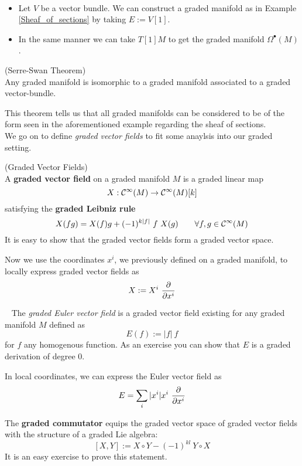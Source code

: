 \begin{example}~
\begin{itemize}
  \item Let $V$ be a vector bundle. We can construct a graded manifold as in Example \ref{Sheaf_of_sections} by taking $E:= V[1]$.

  \item In the same manner we can take $T[1]M$ to get the graded manifold $\Omega^\bullet(M)$.
\end{itemize}
\end{example}

\begin{theo} (Serre-Swan Theorem)\\
  Any graded manifold is isomorphic to a graded manifold associated to a graded vector-bundle.
\end{theo}

This theorem tells us that all graded manifolds can be considered to be of the form seen in the aforementioned example regarding the sheaf of sections.\\

We go on to define \emph{graded vector fields} to fit some anaylsis into our graded setting.

\begin{definition} (Graded Vector Fields)\\
  A \textbf{graded vector field} on a graded manifold $M$ is a graded linear map
  $$ X:\mathcal{C}^{\infty}(M) \rightarrow \mathcal{C}^{\infty}(M)[k] $$
  satisfying the \textbf{graded Leibniz rule}
  $$ X(fg) = X(f) g + (-1)^{k|f|} \ f \ X(g) \quad \quad \forall f,g \in \mathcal{C}^{\infty}(M)$$
  It is easy to show that the graded vector fields form a graded vector space.
\end{definition}

Now we use the coordinates $x^i$, we previously defined on a graded manifold, to locally express graded vector fields as
$$ X := X^i \ \dell{}{x^i} $$

\begin{example}~
  The \emph{graded Euler vector field} is a graded vector field existing for any graded manifold $M$ defined as
  $$ E(f) := |f| \ f $$
  for $f$ any homogenous function. As an exercise you can show that $E$ is a graded derivation of degree $0$.
\end{example}

In local coordinates, we can express the Euler vector field as
$$ E = \sum_i |x^i| x^i \ \frac{\partial }{\partial x^i} $$

\begin{rem}
  The \textbf{graded commutator} equips the graded vector space of graded vector fields with the structure of a graded Lie algebra:
  $$ [X,Y] := X \circ Y - (-1)^{kl} \ Y \circ X $$
  It is an easy exercise to prove this statement.
\end{rem}

